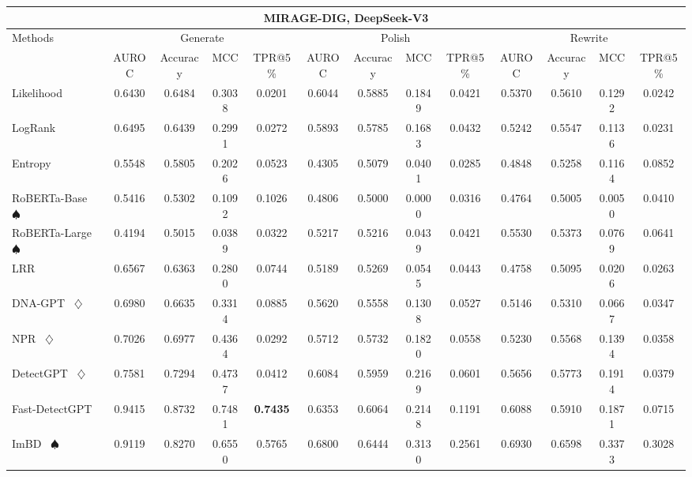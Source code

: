 \begin{table*}[h]
{\begin{tabular}{l|cccc|cccc|cccc}
    \hline

    \hline
    \multicolumn{13}{c}{\textbf{MIRAGE-DIG, DeepSeek-V3}}\\
    \hline

    \hline

    \hline
    \multirow{2}{*}{Methods}&\multicolumn{4}{c|}{Generate}&\multicolumn{4}{c|}{Polish}&\multicolumn{4}{c}{Rewrite} \\
    &  AUROC  &  Accuracy  &  MCC  &  TPR@5\%  &  AUROC  &  Accuracy  &  MCC  &  TPR@5\%  &  AUROC  &  Accuracy  &  MCC  &  TPR@5\%  \\
    \hline

    \hline
    Likelihood~\cite{likelihood} & 0.6430 & 0.6484 & 0.3038 & 0.0201 & 0.6044 & 0.5885 & 0.1849 & 0.0421 & 0.5370 & 0.5610 & 0.1292 & 0.0242 \\
    LogRank~\cite{logrank} & 0.6495 & 0.6439 & 0.2991 & 0.0272 & 0.5893 & 0.5785 & 0.1683 & 0.0432 & 0.5242 & 0.5547 & 0.1136 & 0.0231 \\
    Entropy~\cite{entropy} & 0.5548 & 0.5805 & 0.2026 & 0.0523 & 0.4305 & 0.5079 & 0.0401 & 0.0285 & 0.4848 & 0.5258 & 0.1164 & 0.0852 \\
    RoBERTa-Base~\cite{roberta} $\spadesuit$ & 0.5416 & 0.5302 & 0.1092 & 0.1026 & 0.4806 & 0.5000 & 0.0000 & 0.0316 & 0.4764 & 0.5005 & 0.0050 & 0.0410 \\
    RoBERTa-Large~\cite{roberta} $\spadesuit$ & 0.4194 & 0.5015 & 0.0389 & 0.0322 & 0.5217 & 0.5216 & 0.0439 & 0.0421 & 0.5530 & 0.5373 & 0.0769 & 0.0641 \\
    LRR~\cite{lrrandnpr} & 0.6567 & 0.6363 & 0.2800 & 0.0744 & 0.5189 & 0.5269 & 0.0545 & 0.0443 & 0.4758 & 0.5095 & 0.0206 & 0.0263 \\
    DNA-GPT~\cite{dna-gpt} $\diamondsuit$ & 0.6980 & 0.6635 & 0.3314 & 0.0885 & 0.5620 & 0.5558 & 0.1308 & 0.0527 & 0.5146 & 0.5310 & 0.0667 & 0.0347 \\
    NPR~\cite{lrrandnpr} $\diamondsuit$ & 0.7026 & 0.6977 & 0.4364 & 0.0292 & 0.5712 & 0.5732 & 0.1820 & 0.0558 & 0.5230 & 0.5568 & 0.1394 & 0.0358 \\
    DetectGPT~\cite{detectgpt} $\diamondsuit$ & 0.7581 & 0.7294 & 0.4737 & 0.0412 & 0.6084 & 0.5959 & 0.2169 & 0.0601 & 0.5656 & 0.5773 & 0.1914 & 0.0379 \\
    Fast-DetectGPT~\cite{fastdetectgpt} & 0.9415 & 0.8732 & 0.7481 & \textbf{0.7435} & 0.6353 & 0.6064 & 0.2148 & 0.1191 & 0.6088 & 0.5910 & 0.1871 & 0.0715 \\
    ImBD~\cite{imbd} $\spadesuit$ & 0.9119 & 0.8270 & 0.6550 & 0.5765 & 0.6800 & 0.6444 & 0.3130 & 0.2561 & 0.6930 & 0.6598 & 0.3373 & 0.3028 \\
    \hline
    

\end{tabular}}
\end{table*}
